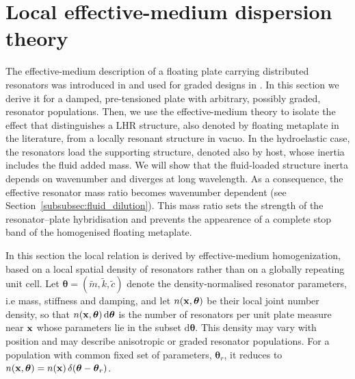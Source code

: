 \section{Local effective-medium dispersion theory} \label{sec:dispersion_relation}
The effective-medium description of a floating plate carrying distributed resonators was introduced in \cite{liu2025metaplate} and used for graded designs in \cite{liu2025metaplate,jin2026low}. In this section we derive it for a damped, pre-tensioned plate with arbitrary, possibly graded, resonator populations. Then, we use the effective-medium theory to isolate the effect that distinguishes a LHR structure, also denoted by floating metaplate in the literature, from a locally resonant structure in vacuo. In the hydroelastic case, the resonators load the supporting structure, denoted also by host, whose inertia includes the fluid added mass. We will show that the fluid-loaded structure inerta depends on wavenumber and diverges at long wavelength. As a consequence, the effective resonator mass ratio becomes wavenumber dependent (see Section~\ref{subsubsec:fluid_dilution}). This mass ratio sets the strength of the resonator--plate hybridisation and prevents the appearence of a complete stop band of the homogenised floating metaplate.

In this section the local relation is derived by effective-medium homogenization, based on a local spatial density of resonators rather than on a globally repeating unit cell. Let $\boldsymbol{\theta}=(\tilde m,\tilde k,\tilde c)$ denote the density-normalised resonator parameters, i.e mass, stiffness and damping, and let $n(\mathbf{x},\boldsymbol{\theta})$ be their local joint number density, so that $n(\mathbf{x},\boldsymbol{\theta})\,\mathrm{d}\boldsymbol{\theta}$ is the number of resonators per unit plate measure near $\mathbf{x}$ whose parameters lie in the subset $\mathrm{d}\boldsymbol{\theta}$. This density may vary with position and may describe anisotropic or graded resonator populations. For a population with common fixed set of parameters, $\boldsymbol{\theta}_r$, it reduces to $n(\mathbf{x},\boldsymbol{\theta})=n(\mathbf{x})\,\delta(\boldsymbol{\theta}-\boldsymbol{\theta}_r)$. 

